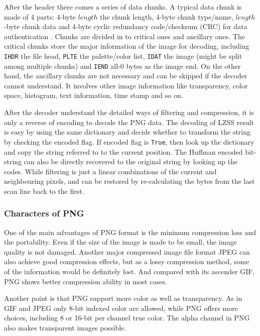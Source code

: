 \documentclass[catalog.tex]{subfiles}
\begin{document}
After the header there comes a series of data chunks. A typical data chunk is made of 4 parts: 4-byte $length$ the chunk length, 4-byte chunk type/name, $length$-byte chunk data and 4-byte cyclic redundancy code/checksum (CRC) for data authentication \cite{W3CPNG}. Chunks are divided in to critical ones and ancillary ones. The critical chunks store the major information of the image for decoding, including \texttt{IHDR} the file head, \texttt{PLTE} the palette/color list, \texttt{IDAT} the image (might be split among multiple chunks) and \texttt{IEND} all-0 bytes as the image end. On the other hand, the ancillary chunks are not necessary and can be skipped if the decoder cannot understand. It involves other image information like transparency, color space, histogram, text information, time stamp and so on. 

After the decoder understand the detailed ways of filtering and compression, it is only a reverse of encoding to decode the PNG data. The decoding of LZSS result is easy by using the same dictionary and decide whether to transform the string by checking the encoded flag. If encoded flag is \texttt{True}, then look up the dictionary and copy the string referred to to the current position. The Huffman encoded bit-string can also be directly recovered to the original string by looking up the codes. While filtering is just a linear combinations of the current and neighbouring pixels, and can be restored by re-calculating the bytes from the last scan line back to the first.

\subsubsection*{Characters of PNG}

One of the main advantages of PNG format is the minimum compression loss and the portability. Even if the size of the image is made to be small, the image quality is not damaged. Another major compressed image file format JPEG can also achieve good compression effects, but as a lossy compression method, some of the information would be definitely lost. And compared with its ascender GIF, PNG shows better compression ability in most cases.

Another point is that PNG support more color as well as transparency. As in GIF and JPEG only 8-bit indexed color are allowed, while PNG offers more choices, including 8 or 16-bit per channel true color. The alpha channel in PNG also makes transparent images possible.
\end{document}
